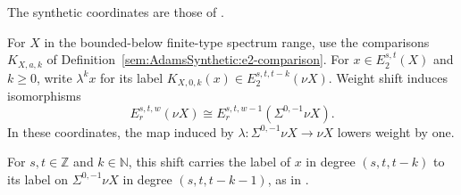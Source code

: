 \begin{proposition}
\label{sem:Literature:nu-page-coordinates}
The synthetic coordinates are those of \cite[Theorem A.8]{BHS}.\par

For $X$ in the bounded-below finite-type spectrum range, use the
comparisons $K_{X,a,k}$ of
Definition~\ref{sem:AdamsSynthetic:e2-comparison}. For
$x\in E_2^{s,t}(X)$ and $k\ge0$, write $\lambda^kx$ for its label
$K_{X,0,k}(x)\in E_2^{s,t,t-k}(\nu X)$.
Weight shift induces isomorphisms
\[E_r^{s,t,w}(\nu X)\cong E_r^{s,t,w-1}(\Sigma^{0,-1}\nu X).\]
In these coordinates, the map induced by
$\lambda:\Sigma^{0,-1}\nu X\to\nu X$ lowers weight by one.

For $s,t\in\mathbb Z$ and $k\in\mathbb N$, this shift carries
the label of $x$ in degree $(s,t,t-k)$ to its label on
$\Sigma^{0,-1}\nu X$ in degree $(s,t,t-k-1)$, as in
\cite[Theorem A.8(2)]{BHS}.


\end{proposition}

